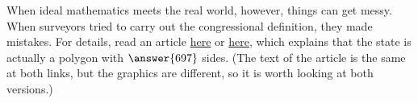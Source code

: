 \documentclass{ximera}
\begin{document}
\begin{problem}
\begin{problem}
\begin{problem}
When ideal mathematics meets the real world, however, things can get messy.  When surveyors tried to carry out the congressional definition, they made mistakes.  For details, read an article \href{https://www.atlasobscura.com/articles/is-colorado-a-rectangle}{here} or \href{https://bigthink.com/strange-maps/colorado-is-not-a-rectangle/}{here}, which explains that the state is actually a polygon with $\answer{697}$ sides.  (The text of the article is the same at both links, but the graphics are different, so it is worth looking at both versions.) 


%
%
%
%



\end{problem}

\end{problem}

\end{problem}
\end{document}

